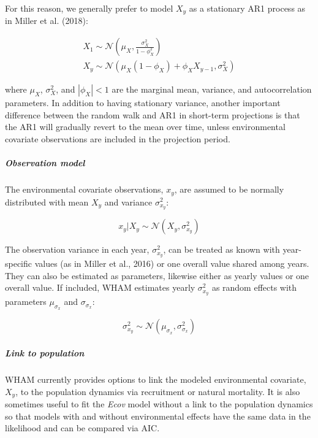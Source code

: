 \documentclass[]{article}
\let\oldsubparagraph\subparagraph
\renewcommand{\subparagraph}[1]{\oldsubparagraph{#1}\mbox{}}
\begin{document}
For this reason, we generally prefer to model \(X_y\) as a stationary
AR1 process as in Miller et al. (2018):

\begin{equation}
  \begin{array}{cc}
    X_1 \sim \mathcal{N} \left( \mu_X, \frac{\sigma^2_X}{1-\phi^2_X} \right) \\
    X_y \sim \mathcal{N} \left( \mu_X(1-\phi_X) + \phi_X X_{y-1}, \sigma^2_X \right)
  \end{array}
\end{equation}

where \(\mu_X\), \(\sigma^2_X\), and \(|\phi_X| < 1\) are the marginal
mean, variance, and autocorrelation parameters. In addition to having
stationary variance, another important difference between the random
walk and AR1 in short-term projections is that the AR1 will gradually
revert to the mean over time, unless environmental covariate
observations are included in the projection period.

\hypertarget{observation-model}{%
\subparagraph{Observation model}\label{observation-model}}

The environmental covariate observations, \(x_y\), are assumed to be
normally distributed with mean \(X_y\) and variance \(\sigma^2_{x_y}\):

\[x_y | X_y \sim \mathcal{N}\left( X_y, \sigma^2_{x_y} \right)\]

The observation variance in each year, \(\sigma^2_{x_y}\), can be
treated as known with year-specific values (as in Miller et al., 2016)
or one overall value shared among years. They can also be estimated as
parameters, likewise either as yearly values or one overall value. If
included, WHAM estimates yearly \(\sigma^2_{x_y}\) as random effects
with parameters \(\mu_{\sigma_x}\) and \(\sigma_{\sigma_x}\):

\[\sigma^2_{x_y} \sim \mathcal{N} \left( \mu_{\sigma_x}, \sigma^2_{\sigma_x} \right)\]

\hypertarget{link-to-population}{%
\subparagraph{Link to population}\label{link-to-population}}

WHAM currently provides options to link the modeled environmental
covariate, \(X_y\), to the population dynamics via recruitment or
natural mortality. It is also sometimes useful to fit the \emph{Ecov}
model without a link to the population dynamics so that models with and
without environmental effects have the same data in the likelihood and
can be compared via AIC.
\end{document}
